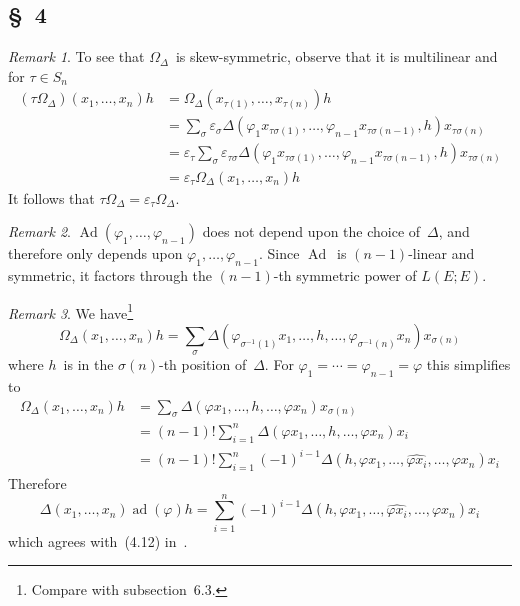 \documentclass[letterpaper,12pt]{article}
\DeclareMathOperator{\ad}{ad}
\DeclareMathOperator{\Ad}{Ad}
\newcommand{\delete}{\widehat}
\newcommand{\sign}[1]{\varepsilon_{#1}}
\theoremstyle{definition}
\theoremstyle{remark}
\newtheorem*{rmk}{Remark}
\begin{document}
\subsection*{\S~4}
\begin{rmk}
To see that \(\Omega_{\Delta}\)~is skew-symmetric, observe that it is multilinear and for \(\tau\in S_n\)
\begin{align*}
(\tau\Omega_{\Delta})(x_1,\ldots,x_n)h&=\Omega_{\Delta}(x_{\tau(1)},\ldots,x_{\tau(n)})h\\
	&=\sum_{\sigma}\sign{\sigma}\Delta(\varphi_1x_{\tau\sigma(1)},\ldots,\varphi_{n-1}x_{\tau\sigma(n-1)},h)x_{\tau\sigma(n)}\\
	&=\sign{\tau}\sum_{\sigma}\sign{\tau\sigma}\Delta(\varphi_1x_{\tau\sigma(1)},\ldots,\varphi_{n-1}x_{\tau\sigma(n-1)},h)x_{\tau\sigma(n)}\\
	&=\sign{\tau}\Omega_{\Delta}(x_1,\ldots,x_n)h
\end{align*}
It follows that \(\tau\Omega_{\Delta}=\sign{\tau}\Omega_{\Delta}\).
\end{rmk}

\begin{rmk}
\(\Ad(\varphi_1,\ldots,\varphi_{n-1})\) does not depend upon the choice of~\(\Delta\), and therefore only depends upon \(\varphi_1,\ldots,\varphi_{n-1}\). Since \(\Ad\)~is \((n-1)\)-linear and symmetric, it factors through the \((n-1)\)-th symmetric power of \(L(E;E)\).
\end{rmk}

\begin{rmk}
We have\footnote{Compare with subsection~6.3.}
\[\Omega_{\Delta}(x_1,\ldots,x_n)h=\sum_{\sigma}\Delta(\varphi_{\sigma^{-1}(1)}x_1,\ldots,h,\ldots,\varphi_{\sigma^{-1}(n)}x_n)x_{\sigma(n)}\]
where \(h\)~is in the \(\sigma(n)\)-th position of~\(\Delta\). For \(\varphi_1=\cdots=\varphi_{n-1}=\varphi\) this simplifies to
\begin{align*}
\Omega_{\Delta}(x_1,\ldots,x_n)h&=\sum_{\sigma}\Delta(\varphi x_1,\ldots,h,\ldots,\varphi x_n)x_{\sigma(n)}\\
	&=(n-1)!\sum_{i=1}^n\Delta(\varphi x_1,\ldots,h,\ldots,\varphi x_n)x_i\\
	&=(n-1)!\sum_{i=1}^n(-1)^{i-1}\Delta(h,\varphi x_1,\ldots,\delete{\varphi x_i},\ldots,\varphi x_n)x_i
\end{align*}
Therefore
\[\Delta(x_1,\ldots,x_n)\ad(\varphi)h=\sum_{i=1}^n(-1)^{i-1}\Delta(h,\varphi x_1,\ldots,\delete{\varphi x_i},\ldots,\varphi x_n)x_i\]
which agrees with~(4.12) in~\cite{greub1}.
\end{rmk}
\end{document}
